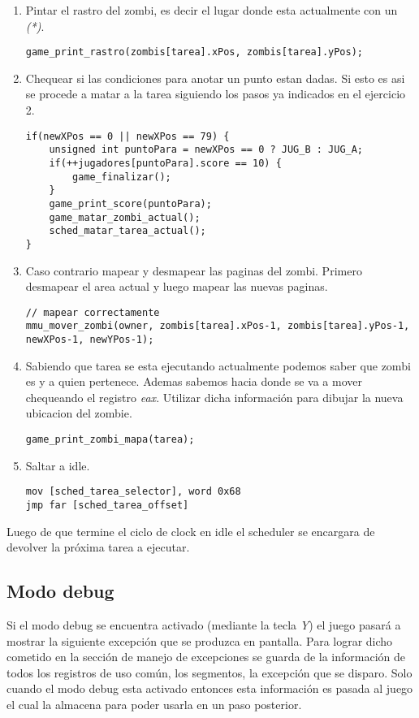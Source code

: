 	\begin{enumerate}
		\item Pintar el rastro del zombi, es decir el lugar donde esta actualmente con un \textit{(*)}.
\begin{lstlisting}
game_print_rastro(zombis[tarea].xPos, zombis[tarea].yPos);
\end{lstlisting}



		\item Chequear si las condiciones para anotar un punto estan dadas. Si esto es asi se procede a matar a la tarea siguiendo los pasos ya indicados en el ejercicio 2.
\begin{lstlisting}
if(newXPos == 0 || newXPos == 79) {
    unsigned int puntoPara = newXPos == 0 ? JUG_B : JUG_A;
    if(++jugadores[puntoPara].score == 10) {
        game_finalizar();
    }
    game_print_score(puntoPara);
    game_matar_zombi_actual();
    sched_matar_tarea_actual();
}
\end{lstlisting}

		\item Caso contrario mapear y desmapear las paginas del zombi. Primero desmapear el area actual y luego mapear las nuevas paginas.
\begin{lstlisting}
// mapear correctamente
mmu_mover_zombi(owner, zombis[tarea].xPos-1, zombis[tarea].yPos-1, newXPos-1, newYPos-1);
\end{lstlisting}

        \item Sabiendo que tarea se esta ejecutando actualmente podemos saber que zombi es y a quien pertenece. Ademas sabemos hacia donde se va a mover chequeando el registro \textit{eax}. Utilizar dicha información para dibujar la nueva ubicacion del zombie.
\begin{lstlisting}
game_print_zombi_mapa(tarea);
\end{lstlisting}

		\item Saltar a idle.
\begin{lstlisting}
mov [sched_tarea_selector], word 0x68
jmp far [sched_tarea_offset]
\end{lstlisting}        
	\end{enumerate}

	Luego de que termine el ciclo de clock en idle el scheduler se encargara de devolver la próxima tarea a ejecutar.

	\subsection{Modo debug}
	Si el modo debug se encuentra activado (mediante la tecla \textit{Y}) el juego pasará a mostrar la siguiente excepción que se produzca en pantalla. Para lograr dicho cometido en la sección de manejo de excepciones se guarda de la información de todos los registros de uso común, los segmentos, la excepción que se disparo. Solo cuando el modo debug esta activado entonces esta información es pasada al juego el cual la almacena para poder usarla en un paso posterior.

